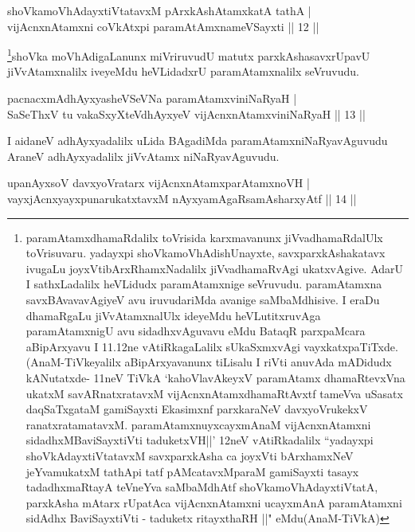 \begin{shl}
shoVkamoVhAdayxtiVtatavxM pArxkAshAtamxkatA tathA |\\
vijAcnxnAtamxni coVkAtx\s pi paramAtAmxnameVSayxti \hfill || 12 ||
\end{shl}

\begin{artha}
\footnote{paramAtamxdhamaRdalilx toVrisida karxmavanunx jiVvadhamaRdalUlx toVrisuvaru. yadayxpi shoVkamoVhAdishUnayxte, savxparxkAshakatavx ivugaLu joyxVtibArxRhamxNadalilx jiVvadhamaRvAgi ukatxvAgive. AdarU I sathxLadalilx heVLidudx paramAtamxnige seVruvudu. paramAtamxna savxBAvavavAgiyeV avu iruvudariMda avanige saMbaMdhisive. I eraDu dhamaRgaLu jiVvAtamxnalUlx ideyeMdu heVLutitxruvAga paramAtamxnigU avu sidadhxvAguvavu eMdu BataqR parxpaMcara aBipArxyavu I 11.12ne vAtiRkagaLalilx sUkaSxmxvAgi vayxkatxpaTiTxde. (AnaM-TiVkeyalilx aBipArxyavanunx tiLisalu I riVti anuvAda mADidudx kANutatxde- 11neV TiVkA `kahoVlavAkeyxV paramAtamx dhamaRtevxVna ukatxM savARnatxratavxM vijAcnxnAtamxdhamaRtAvxtf tameVva uSasatx daqSaTxgataM gamiSayxti Ekasimxnf parxkaraNeV davxyoVrukekxV ranatxratamatavxM. paramAtamxnuyxcayxmAnaM vijAcnxnAtamxni sidadhxMBaviSayxtiVti taduketxVH||' 12neV vAtiRkadalilx ``yadayxpi shoVkAdayxtiVtatavxM savxparxkAsha ca joyxVti bArxhamxNeV jeYvamukatxM tathApi tatf pAMcatavxMparaM gamiSayxti tasayx tadadhxmaRtayA teVneYva saMbaMdhAtf shoVkamoVhAdayxtiVtatA, parxkAsha mAtarx rUpatAca vijAcnxnAtamxni ucayxmAnA paramAtamxni sidAdhx BaviSayxtiVti - taduketx ritayxthaRH ||" eMdu\break (AnaM-TiVkA)}shoVka moVhAdigaLanunx miVriruvudU matutx parxkAsha\break savxrUpavU jiVvAtamxnalilx iveyeMdu heVLidadxrU paramAtamxnalilx seVruvudu.
\end{artha}


\begin{shl}
pacnacxmAdhAyxyasheVSeVNa paramAtamxviniNaRyaH |\\
SaSeThxV tu vakaSxyXteV\s dhAyxyeV vijAcnxnAtamxviniNaRyaH \hfill || 13 ||
\end{shl}

\begin{artha}
I aidaneV adhAyxyadalilx uLida BAgadiMda paramAtamxniNaRyavAguvudu AraneV adhAyxyadalilx jiVvAtamx niNaRyavAguvudu.
\end{artha}

\begin{shl}
upanAyxsoV davxyoVratarx vijAcnxnAtamxparAtamxnoVH |\\
vayxjAcnxyayxpunarukatxtavxM nAyxyamAgaRsamAsharxyAtf \hfill || 14 ||
\end{shl}

